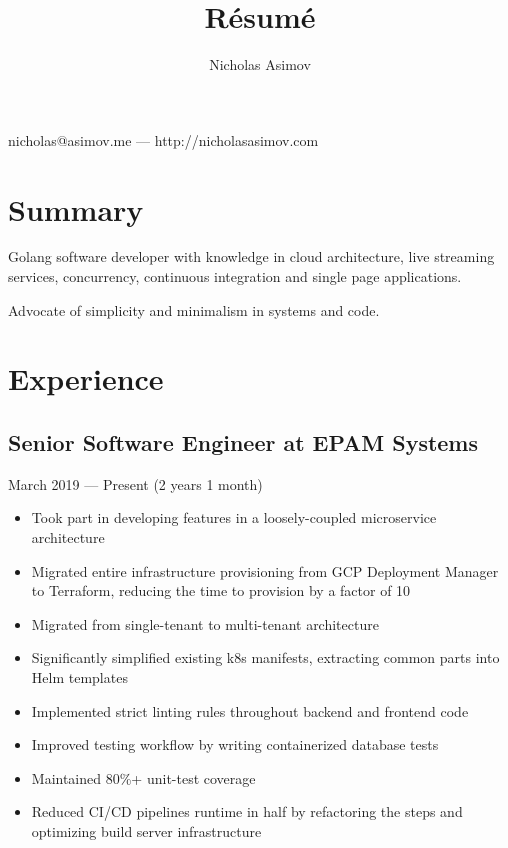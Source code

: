 \documentclass[a4paper,11pt]{article}
\makeatletter
\renewcommand{\maketitle}{
    \begin{center}
        {
            \huge
            \bfseries
            \theauthor
        }
 
        \vspace{.25em}
        nicholas@asimov.me --- http://nicholasasimov.com
    \end{center}
}
\makeatother
\begin{document}
\title{R\'esum\'e}
\author{Nicholas Asimov}

\maketitle

\section{Summary}

Golang software developer with knowledge in cloud architecture, live streaming services, concurrency,
continuous integration and single page applications.
\newline

\noindent
Advocate of simplicity and minimalism in systems and code.

\section{Experience}

\subsection{Senior Software Engineer at EPAM Systems}
March 2019 --- Present (2 years 1 month)
\begin{itemize}[noitemsep]
    \renewcommand{\labelitemi}{---}

    \item Took part in developing features in a loosely-coupled microservice architecture
    \item Migrated entire infrastructure provisioning from GCP Deployment Manager to Terraform, reducing the time to provision by a factor of 10
    \item Migrated from single-tenant to multi-tenant architecture
    \item Significantly simplified existing k8s manifests, extracting common parts into Helm templates
    \item Implemented strict linting rules throughout backend and frontend code
    \item Improved testing workflow by writing containerized database tests
    \item Maintained 80\%+ unit-test coverage
    \item Reduced CI/CD pipelines runtime in half by refactoring the steps and optimizing build server infrastructure
\end{itemize}
\end{document}
